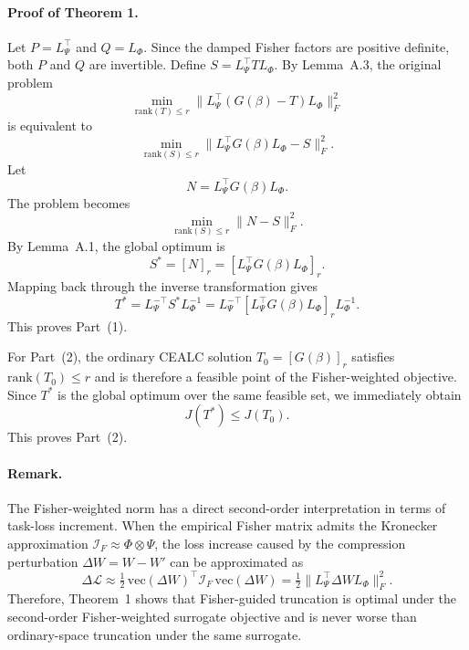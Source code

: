 \documentclass[a4paper,fleqn]{cas-dc}
\begin{document}
\paragraph{Proof of Theorem 1.}
Let $P=L_\Psi^{\top}$ and $Q=L_\Phi$. Since the damped Fisher factors are positive definite, both $P$ and $Q$ are invertible. Define $S=L_\Psi^{\top}TL_\Phi$. By Lemma~A.3, the original problem
\begin{equation}
\min_{\mathrm{rank}(T)\le r} \|L_\Psi^{\top}(G(\beta)-T)L_\Phi\|_F^2
\end{equation}
is equivalent to
\begin{equation}
\min_{\mathrm{rank}(S)\le r} \|L_\Psi^{\top}G(\beta)L_\Phi-S\|_F^2.
\end{equation}
Let
\begin{equation}
N=L_\Psi^{\top}G(\beta)L_\Phi.
\end{equation}
The problem becomes
\begin{equation}
\min_{\mathrm{rank}(S)\le r} \|N-S\|_F^2.
\end{equation}
By Lemma~A.1, the global optimum is
\begin{equation}
S^*=[N]_r=[L_\Psi^{\top}G(\beta)L_\Phi]_r.
\end{equation}
Mapping back through the inverse transformation gives
\begin{equation}
T^*=L_\Psi^{-\top}S^*L_\Phi^{-1}=L_\Psi^{-\top}[L_\Psi^{\top}G(\beta)L_\Phi]_rL_\Phi^{-1}.
\end{equation}
This proves Part~(1).

For Part~(2), the ordinary CEALC solution $T_0=[G(\beta)]_r$ satisfies $\mathrm{rank}(T_0)\le r$ and is therefore a feasible point of the Fisher-weighted objective. Since $T^*$ is the global optimum over the same feasible set, we immediately obtain
\begin{equation}
J(T^*)\le J(T_0).
\end{equation}
This proves Part~(2).

\paragraph{Remark.}
The Fisher-weighted norm has a direct second-order interpretation in terms of task-loss increment. When the empirical Fisher matrix admits the Kronecker approximation $\mathcal{I}_F \approx \Phi \otimes \Psi$, the loss increase caused by the compression perturbation $\Delta W = W-W'$ can be approximated as
\begin{equation}
\Delta \mathcal{L} \approx \tfrac{1}{2}\,\mathrm{vec}(\Delta W)^{\top} \mathcal{I}_F \, \mathrm{vec}(\Delta W)
= \tfrac{1}{2}\|L_\Psi^{\top}\Delta W L_\Phi\|_F^2.
\end{equation}
Therefore, Theorem~1 shows that Fisher-guided truncation is optimal under the second-order Fisher-weighted surrogate objective and is never worse than ordinary-space truncation under the same surrogate.
\end{document}

